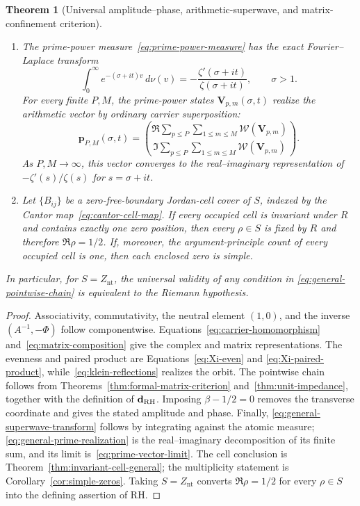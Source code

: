 \documentclass[11pt]{article}
\newtheorem{theorem}[definition]{Theorem}
\newcommand{\Znt}{Z_{\mathrm{nt}}}
\begin{document}
\begin{theorem}[Universal amplitude--phase, arithmetic-superwave, and matrix-confinement criterion]
\begin{enumerate}
 \item The prime-power measure~\eqref{eq:prime-power-measure} has the exact Fourier--Laplace
 transform
 \begin{equation}\label{eq:general-superwave-transform}
  \int_0^\infty e^{-(\sigma+it)v}\,d\nu(v)
  =-\frac{\zeta'(\sigma+it)}{\zeta(\sigma+it)},\qquad \sigma>1.
 \end{equation}
 For every finite $P,M$, the prime-power states
 $\mathbf V_{p,m}(\sigma,t)$ realize the arithmetic vector by ordinary carrier
 superposition:
 \begin{equation}\label{eq:general-prime-realization}
  \mathbf p_{P,M}(\sigma,t)
  =\binom{\Re\displaystyle\sum_{p\le P}\sum_{1\le m\le M}
      \mathcal W(\mathbf V_{p,m})}
     {\Im\displaystyle\sum_{p\le P}\sum_{1\le m\le M}
      \mathcal W(\mathbf V_{p,m})}.
 \end{equation}
 As $P,M\to\infty$, this vector converges to the real--imaginary representation of
 $-\zeta'(s)/\zeta(s)$ for $s=\sigma+it$.

 \item Let $\{B_{ij}\}$ be a zero-free-boundary Jordan-cell cover of $S$, indexed by the
 Cantor map~\eqref{eq:cantor-cell-map}.  If every occupied cell is invariant under $R$ and
 contains exactly one zero position, then every $\rho\in S$ is fixed by $R$ and therefore
 $\Re\rho=1/2$.  If, moreover, the argument-principle count of every occupied cell is one,
 then each enclosed zero is simple.
\end{enumerate}

In particular, for $S=\Znt$, the universal validity of any condition in
\eqref{eq:general-pointwise-chain} is equivalent to the Riemann hypothesis.
\end{theorem}

\begin{proof}
Associativity, commutativity, the neutral element $(1,0)$, and the inverse
$(A^{-1},-\Phi)$ follow componentwise.  Equations~\eqref{eq:carrier-homomorphism}
and~\eqref{eq:matrix-composition} give the complex and matrix representations.  The
evenness and paired product are Equations~\eqref{eq:Xi-even} and
\eqref{eq:Xi-paired-product}, while~\eqref{eq:klein-reflections} realizes the orbit.
The pointwise chain follows from Theorems~\ref{thm:formal-matrix-criterion}
and~\ref{thm:unit-impedance}, together with the definition of $\mathbf d_{\rm RH}$.
Imposing $\beta-1/2=0$ removes the transverse
coordinate and gives the stated amplitude and phase.  Finally,
\eqref{eq:general-superwave-transform} follows by integrating against the atomic measure;
\eqref{eq:general-prime-realization} is the real--imaginary decomposition of its finite sum,
and its limit is~\eqref{eq:prime-vector-limit}.  The cell conclusion is
Theorem~\ref{thm:invariant-cell-general}; the multiplicity statement is
Corollary~\ref{cor:simple-zeros}.  Taking
$S=\Znt$ converts $\Re\rho=1/2$ for every $\rho\in S$ into the defining assertion of RH.
\end{proof}
\end{document}
